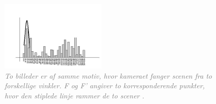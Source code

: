 \begin{figure}[H]
    \centering
    \includegraphics[width=0.45\textwidth]{fig/sift-orientation-histogram.jpg}
     \vspace{-1em}
    \begin{center}    
       \caption{\textcolor{gray}{\footnotesize \textit{To billeder er af samme motiv, hvor kameraet fanger scenen fra to forskellige vinkler. F og F' angiver to korresponderende punkter, hvor den stiplede linje rammer de to scener \cite{kim}.}}}
    \label{fig:1}
     \end{center}
     \vspace{-2.5em}
  \end{figure} \noindent
